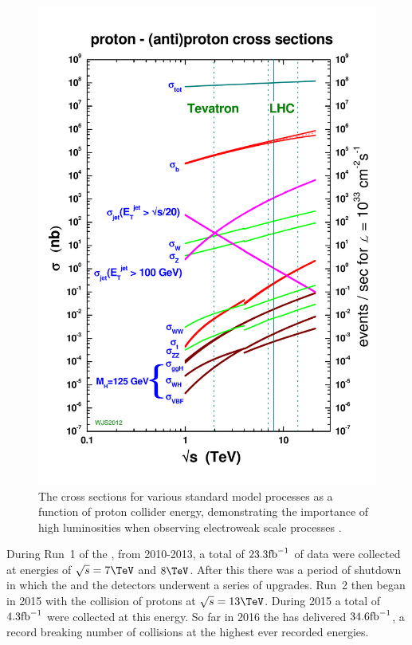 \begin{figure}
  \includegraphics[width=\mediumfigwidth]{figs/crosssections2012_v5}
  \caption[]%
  { The cross sections for various standard model processes as a
  function of proton collider energy, demonstrating the importance of
  high luminosities when observing electroweak scale processes
  \cite{stirlingCrossSec1}.}%
  \label{fig:xsecs}
\end{figure}

During Run~1 of the \LHC, from 2010-2013, a total of $23.3\text{fb}^{-1}$ of
data were collected at energies of $\sqrt{s}=7\tev$ and $8\tev$. After
this there was a period of shutdown in which the \LHC and the
detectors underwent a series of upgrades. Run~2 then began in 2015
with the collision of protons at $\sqrt{s}=13\tev$. During 2015 a
total of $4.3\text{fb}^{-1}$ were collected at this energy. So far in 2016 the
\LHC has delivered $34.6\text{fb}^{-1}$, a record breaking number of collisions
at the highest ever recorded energies. 

